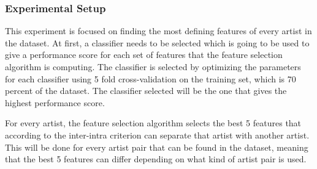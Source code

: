 %
%
%

\subsubsection{Experimental Setup}

This experiment is focused on finding the most defining features of every artist in the dataset.
At first, a classifier needs to be selected which is going to be used to give a performance score for each set of features that the feature selection algorithm is computing.
The classifier is selected by optimizing the parameters for each classifier using 5 fold cross-validation on the training set, which is 70 percent of the dataset.
The classifier selected will be the one that gives the highest performance score.

For every artist, the feature selection algorithm selects the best 5 features that according to the inter-intra criterion can separate that artist with another artist.
This will be done for every artist pair that can be found in the dataset, meaning that the best 5 features can differ depending on what kind of artist pair is used.

